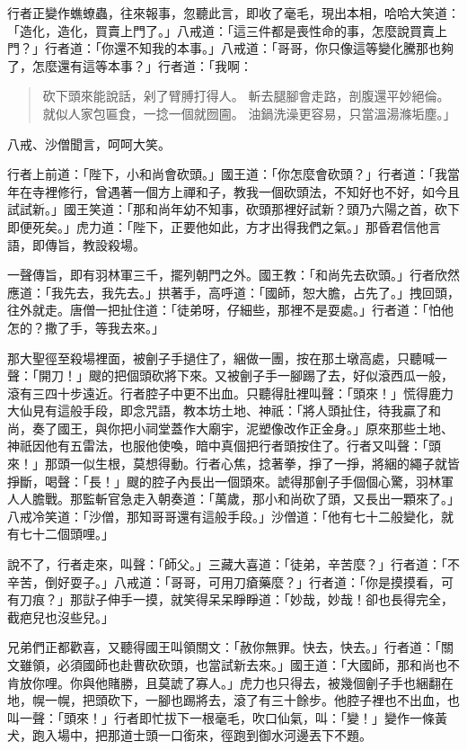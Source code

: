行者正變作蟭蟟蟲，往來報事，忽聽此言，即收了毫毛，現出本相，哈哈大笑道：「造化，造化，買賣上門了。」八戒道：「這三件都是喪性命的事，怎麼說買賣上門？」行者道：「你還不知我的本事。」八戒道：「哥哥，你只像這等變化騰那也夠了，怎麼還有這等本事？」行者道：「我啊：
\begin{quote}
砍下頭來能說話，剁了臂膊打得人。
斬去腿腳會走路，剖腹還平妙絕倫。
就似人家包匾食，一捻一個就囫圇。
油鍋洗澡更容易，只當溫湯滌垢塵。」
\end{quote}

八戒、沙僧聞言，呵呵大笑。

行者上前道：「陛下，小和尚會砍頭。」國王道：「你怎麼會砍頭？」行者道：「我當年在寺裡修行，曾遇著一個方上禪和子，教我一個砍頭法，不知好也不好，如今且試試新。」國王笑道：「那和尚年幼不知事，砍頭那裡好試新？頭乃六陽之首，砍下即便死矣。」虎力道：「陛下，正要他如此，方才出得我們之氣。」那昏君信他言語，即傳旨，教設殺場。

一聲傳旨，即有羽林軍三千，擺列朝門之外。國王教：「和尚先去砍頭。」行者欣然應道：「我先去，我先去。」拱著手，高呼道：「國師，恕大膽，占先了。」拽回頭，往外就走。唐僧一把扯住道：「徒弟呀，仔細些，那裡不是耍處。」行者道：「怕他怎的？撒了手，等我去來。」

那大聖徑至殺場裡面，被劊子手撾住了，綑做一團，按在那土墩高處，只聽喊一聲：「開刀！」颼的把個頭砍將下來。又被劊子手一腳踢了去，好似滾西瓜一般，滾有三四十步遠近。行者腔子中更不出血。只聽得肚裡叫聲：「頭來！」慌得鹿力大仙見有這般手段，即念咒語，教本坊土地、神祇：「將人頭扯住，待我贏了和尚，奏了國王，與你把小祠堂蓋作大廟宇，泥塑像改作正金身。」原來那些土地、神祇因他有五雷法，也服他使喚，暗中真個把行者頭按住了。行者又叫聲：「頭來！」那頭一似生根，莫想得動。行者心焦，捻著拳，掙了一掙，將綑的繩子就皆掙斷，喝聲：「長！」颼的腔子內長出一個頭來。諕得那劊子手個個心驚，羽林軍人人膽戰。那監斬官急走入朝奏道：「萬歲，那小和尚砍了頭，又長出一顆來了。」八戒冷笑道：「沙僧，那知哥哥還有這般手段。」沙僧道：「他有七十二般變化，就有七十二個頭哩。」

說不了，行者走來，叫聲：「師父。」三藏大喜道：「徒弟，辛苦麼？」行者道：「不辛苦，倒好耍子。」八戒道：「哥哥，可用刀瘡藥麼？」行者道：「你是摸摸看，可有刀痕？」那獃子伸手一摸，就笑得呆呆睜睜道：「妙哉，妙哉！卻也長得完全，截疤兒也沒些兒。」

兄弟們正都歡喜，又聽得國王叫領關文：「赦你無罪。快去，快去。」行者道：「關文雖領，必須國師也赴曹砍砍頭，也當試新去來。」國王道：「大國師，那和尚也不肯放你哩。你與他賭勝，且莫諕了寡人。」虎力也只得去，被幾個劊子手也綑翻在地，幌一幌，把頭砍下，一腳也踢將去，滾了有三十餘步。他腔子裡也不出血，也叫一聲：「頭來！」行者即忙拔下一根毫毛，吹口仙氣，叫：「變！」變作一條黃犬，跑入場中，把那道士頭一口銜來，徑跑到御水河邊丟下不題。

